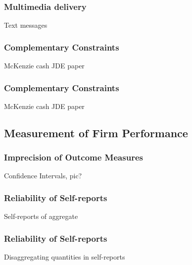 \documentclass[hideothersubsections, usenames,dvipsnames,11pt]{beamer}
\newenvironment{itemize_3pt}{\itemize\addtolength{\itemsep}{3pt}}{\enditemize}
\begin{document}
\begin{frame}
\frametitle{Multimedia delivery}
	Text messages
	\begin{itemize_3pt}
	\item \citep{Cole2019} \citep{Acimovic2020}
	\vspace{0.1in}
	\end{itemize_3pt}
\end{frame}


\begin{frame}
\frametitle{Complementary Constraints}
	\begin{itemize_3pt}
	\item McKenzie cash JDE paper
	\vspace{0.1in}
	\end{itemize_3pt}
\end{frame}

\begin{frame}
\frametitle{Complementary Constraints}
	\begin{itemize_3pt}
	\item McKenzie cash JDE paper
	\vspace{0.1in}
	\end{itemize_3pt}
\end{frame}


\subsection{Measurement of Firm Performance}

\begin{frame}
\frametitle{Imprecision of Outcome Measures}
	\begin{itemize_3pt}
	\item Confidence Intervals, pic?
	\vspace{0.1in}
	\end{itemize_3pt}
\end{frame}

\begin{frame}
\frametitle{Reliability of Self-reports}
	\begin{itemize_3pt}
	\item Self-reports of aggregate \citep{deMel2009}
	\vspace{0.1in}
	\end{itemize_3pt}
\end{frame}

\begin{frame}
\frametitle{Reliability of Self-reports}
	\begin{itemize_3pt}
	\item Disaggregating quantities in self-reports \citep{deMel2009}
	\vspace{0.1in}
	\end{itemize_3pt}
\end{frame}
\end{document}

